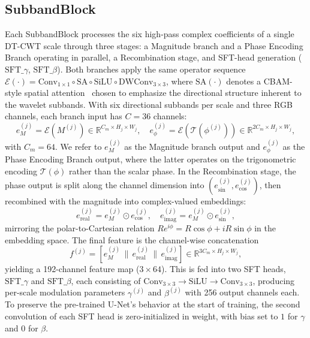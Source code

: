 \subsection{SubbandBlock}
\label{subsec:subband_block}

Each SubbandBlock processes the six high-pass complex coefficients 
of a single DT-CWT scale through three stages: a Magnitude branch 
and a Phase Encoding Branch operating in parallel, a Recombination 
stage, and SFT-head generation ($\mathrm{SFT}\_\gamma$, 
$\mathrm{SFT}\_\beta$). Both branches apply the same operator 
sequence $\mathcal{E}(\cdot) = \mathrm{Conv}_{1\times1} \circ 
\mathrm{SA} \circ \mathrm{SiLU} \circ \mathrm{DWConv}_{3\times3}$, 
where $\mathrm{SA}(\cdot)$ denotes a CBAM-style spatial 
attention~\cite{woo2018cbam} chosen to emphasize the directional 
structure inherent to the wavelet subbands. With six directional 
subbands per scale and three RGB channels, each branch input has 
$C{=}36$ channels:
\begin{equation}
    e_M^{(j)} = \mathcal{E}(M^{(j)}) \in 
    \mathbb{R}^{C_m \times H_j \times W_j}, 
    \quad 
    e_\phi^{(j)} = \mathcal{E}(\mathcal{T}(\phi^{(j)})) \in 
    \mathbb{R}^{2C_m \times H_j \times W_j},
    \label{eq:branches}
\end{equation}
with $C_m = 64$. We refer to $e_M^{(j)}$ as the Magnitude branch 
output and $e_\phi^{(j)}$ as the Phase Encoding Branch output, 
where the latter operates on the trigonometric encoding 
$\mathcal{T}(\phi)$ rather than the scalar phase. In the 
Recombination stage, the phase output is split along the channel 
dimension into $(e_{\sin}^{(j)}, e_{\cos}^{(j)})$, then recombined 
with the magnitude into complex-valued embeddings:
\begin{equation}
    e_{\mathrm{real}}^{(j)} = e_M^{(j)} \odot e_{\cos}^{(j)}, \quad
    e_{\mathrm{imag}}^{(j)} = e_M^{(j)} \odot e_{\sin}^{(j)},
    \label{eq:recombination}
\end{equation}
mirroring the polar-to-Cartesian relation 
$Re^{i\phi} = R\cos\phi + iR\sin\phi$ in the embedding space. 
The final feature is the channel-wise concatenation
\begin{equation}
    f^{(j)} = [e_M^{(j)} \,\|\, e_{\mathrm{real}}^{(j)} \,\|\, 
    e_{\mathrm{imag}}^{(j)}] \in \mathbb{R}^{3C_m \times H_j \times W_j},
    \label{eq:concat_features}
\end{equation}
yielding a 192-channel feature map ($3 \times 64$). This is fed 
into two SFT heads, $\mathrm{SFT}\_\gamma$ and 
$\mathrm{SFT}\_\beta$, each consisting of $\mathrm{Conv}_{3\times3} 
\to \mathrm{SiLU} \to \mathrm{Conv}_{3\times3}$, producing 
per-scale modulation parameters $\gamma^{(j)}$ and $\beta^{(j)}$ 
with 256 output channels each. To preserve the pre-trained U-Net's 
behavior at the start of training, the second convolution of each 
SFT head is zero-initialized in weight, with bias set to $1$ for 
$\gamma$ and $0$ for $\beta$.

